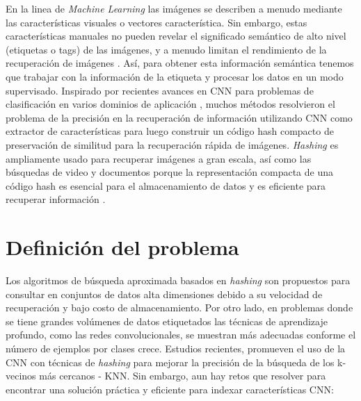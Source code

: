 En la linea de \textit{Machine Learning} las imágenes se describen a menudo mediante las características visuales o vectores característica.  Sin embargo, estas características manuales no pueden revelar el significado semántico de alto nivel (etiquetas o tags) de las imágenes, y a menudo limitan el rendimiento de la recuperación de imágenes \cite{Li:2015:RSS:2881665.2882186}. Así, para obtener esta información semántica tenemos que trabajar con la información de la etiqueta y procesar los datos en un modo supervisado. Inspirado por recientes avances en \acf{CNN} para problemas de clasificación en varios dominios de aplicaci\'on \cite{ImageNet,NIPS2013_5207,LiuWJJC12}, muchos métodos resolvieron el problema de la precisión en la recuperación de informaci\'on utilizando CNN como extractor de características para luego construir un código hash compacto de preservación de similitud para la recuperación rápida de imágenes.   \textit{Hashing} es ampliamente usado para recuperar imágenes a gran escala, así como las búsquedas de video y documentos porque la representación compacta de una código hash es esencial para el almacenamiento de datos y es eficiente para  recuperar información \cite{conf/cvpr/ShenSLS15}. %

\section{Definición del problema}

 
Los  algoritmos de búsqueda aproximada  basados en \textit{hashing} son propuestos para consultar en conjuntos de datos  alta dimensiones debido a su velocidad de recuperación y bajo costo de almacenamiento.  Por otro lado, en problemas donde se tiene grandes volúmenes de datos etiquetados las técnicas de aprendizaje profundo, como las redes convolucionales, se muestran más adecuadas conforme el número de ejemplos por clases crece. Estudios recientes, promueven el uso de la \acf{CNN} con técnicas de  \textit{hashing} para mejorar la precisión de la búsqueda de los k-vecinos más cercanos - KNN.  Sin embargo, aun hay retos que resolver para encontrar una solución práctica y eficiente para indexar características  CNN:

